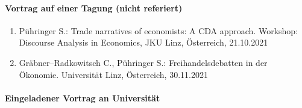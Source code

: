 \paragraph{Vortrag auf einer Tagung (nicht referiert)}
\begin{enumerate}
	\item Pühringer S.: Trade narratives of economists: A CDA approach. Workshop: Discourse Analysis in Economics, JKU Linz, Österreich, 21.10.2021
	\item Gräbner--Radkowitsch C., Pühringer S.: Freihandelsdebatten in der Ökonomie. Universität Linz, Österreich, 30.11.2021
\end{enumerate}
\paragraph{Eingeladener Vortrag an Universität}
